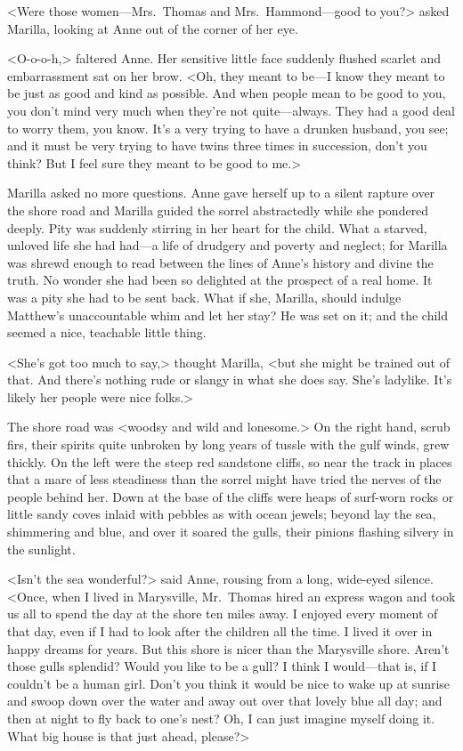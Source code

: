 <Were those women—Mrs.~Thomas and Mrs.~Hammond—good to you?> asked Marilla, looking at Anne out of the corner of her eye.

<O-o-o-h,> faltered Anne. Her sensitive little face suddenly flushed scarlet and embarrassment sat on her brow. <Oh, they meant to be—I know they meant to be just as good and kind as possible. And when people mean to be good to you, you don't mind very much when they're not quite—always. They had a good deal to worry them, you know. It's a very trying to have a drunken husband, you see; and it must be very trying to have twins three times in succession, don't you think? But I feel sure they meant to be good to me.>

Marilla asked no more questions. Anne gave herself up to a silent rapture over the shore road and Marilla guided the sorrel abstractedly while she pondered deeply. Pity was suddenly stirring in her heart for the child. What a starved, unloved life she had had—a life of drudgery and poverty and neglect; for Marilla was shrewd enough to read between the lines of Anne's history and divine the truth. No wonder she had been so delighted at the prospect of a real home. It was a pity she had to be sent back. What if she, Marilla, should indulge Matthew's unaccountable whim and let her stay? He was set on it; and the child seemed a nice, teachable little thing.

<She's got too much to say,> thought Marilla, <but she might be trained out of that. And there's nothing rude or slangy in what she does say. She's ladylike. It's likely her people were nice folks.>

The shore road was <woodsy and wild and lonesome.> On the right hand, scrub firs, their spirits quite unbroken by long years of tussle with the gulf winds, grew thickly. On the left were the steep red sandstone cliffs, so near the track in places that a mare of less steadiness than the sorrel might have tried the nerves of the people behind her. Down at the base of the cliffs were heaps of surf-worn rocks or little sandy coves inlaid with pebbles as with ocean jewels; beyond lay the sea, shimmering and blue, and over it soared the gulls, their pinions flashing silvery in the sunlight.

<Isn't the sea wonderful?> said Anne, rousing from a long, wide-eyed silence. <Once, when I lived in Marysville, Mr.~Thomas hired an express wagon and took us all to spend the day at the shore ten miles away. I enjoyed every moment of that day, even if I had to look after the children all the time. I lived it over in happy dreams for years. But this shore is nicer than the Marysville shore. Aren't those gulls splendid? Would you like to be a gull? I think I would—that is, if I couldn't be a human girl. Don't you think it would be nice to wake up at sunrise and swoop down over the water and away out over that lovely blue all day; and then at night to fly back to one's nest? Oh, I can just imagine myself doing it. What big house is that just ahead, please?>

